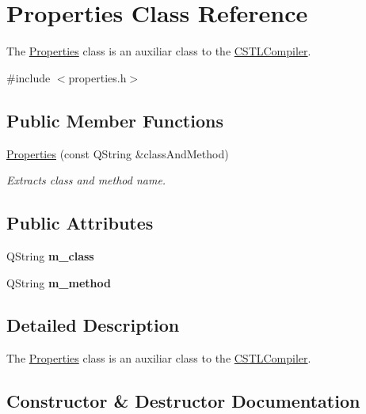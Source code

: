 \hypertarget{class_properties}{}\section{Properties Class Reference}
\label{class_properties}


The \mbox{\hyperlink{class_properties}{Properties}} class is an auxiliar class to the \mbox{\hyperlink{class_c_s_t_l_compiler}{C\+S\+T\+L\+Compiler}}.  




{\ttfamily \#include $<$properties.\+h$>$}

\subsection*{Public Member Functions}
\begin{DoxyCompactItemize}
\item 
\mbox{\hyperlink{class_properties_a8ec1c6bfb9eb2da106cffba3a3d5c18e}{Properties}} (const Q\+String \&class\+And\+Method)
\begin{DoxyCompactList}\small\item\em Extracts class and method name. \end{DoxyCompactList}\end{DoxyCompactItemize}
\subsection*{Public Attributes}
\begin{DoxyCompactItemize}
\item 
\mbox{\label{class_properties_a4efcf4114fb0d0163a0d6a6e894be7f3}} 
Q\+String {\bfseries m\+\_\+class}
\item 
\mbox{\label{class_properties_ae5f86c3cc9714e6d6dd13c8d693d3343}} 
Q\+String {\bfseries m\+\_\+method}
\end{DoxyCompactItemize}


\subsection{Detailed Description}
The \mbox{\hyperlink{class_properties}{Properties}} class is an auxiliar class to the \mbox{\hyperlink{class_c_s_t_l_compiler}{C\+S\+T\+L\+Compiler}}. 

\subsection{Constructor \& Destructor Documentation}
\mbox{\label{class_properties_a8ec1c6bfb9eb2da106cffba3a3d5c18e}} 
